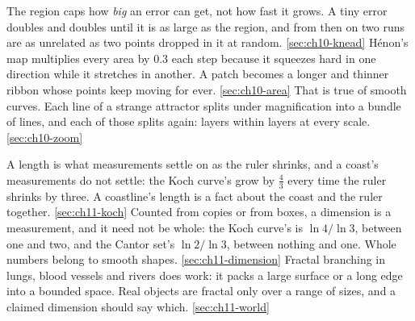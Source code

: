 %
  {The region caps how \emph{big} an error can get, not how fast it grows. A tiny error doubles and doubles until it is as large as the region, and from then on two runs are as unrelated as two points dropped in it at random.}%
  {\ref{sec:ch10-knead}}
%
  {Hénon's map multiplies every area by \num{0.3} each step because it squeezes hard in one direction while it stretches in another. A patch becomes a longer and thinner ribbon whose points keep moving for ever.}%
  {\ref{sec:ch10-area}}
%
  {That is true of smooth curves. Each line of a strange attractor splits under magnification into a bundle of lines, and each of those splits again: layers within layers at every scale.}%
  {\ref{sec:ch10-zoom}}

%
  {A length is what measurements settle on as the ruler shrinks, and a coast's measurements do not settle: the Koch curve's grow by $\tfrac{4}{3}$ every time the ruler shrinks by three. A coastline's length is a fact about the coast and the ruler together.}%
  {\ref{sec:ch11-koch}}
%
  {Counted from copies or from boxes, a dimension is a measurement, and it need not be whole: the Koch curve's is $\ln 4 / \ln 3$, between one and two, and the Cantor set's $\ln 2 / \ln 3$, between nothing and one. Whole numbers belong to smooth shapes.}%
  {\ref{sec:ch11-dimension}}
%
  {Fractal branching in lungs, blood vessels and rivers does work: it packs a large surface or a long edge into a bounded space. Real objects are fractal only over a range of sizes, and a claimed dimension should say which.}%
  {\ref{sec:ch11-world}}

